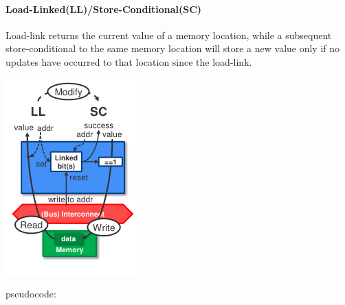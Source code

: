 \documentclass[fontsize=8pt]{scrartcl}
\begin{document}
\begin{multicols*}{4}
\paragraph{Load-Linked(LL)/Store-Conditional(SC)} \mbox{}
\begin{multicols*}{1}Load-link returns the current value of a memory location, while a subsequent store-conditional to the same memory location will store a new value only if no updates have occurred to that location since the load-link.


\begin{center}
  \includegraphics[width=\linewidth]{img/load-linked_overview.png}
  \label{fig:load-linked_overview}
\end{center}
\end{multicols*}

pseudocode:


\end{multicols*}
\end{document}
